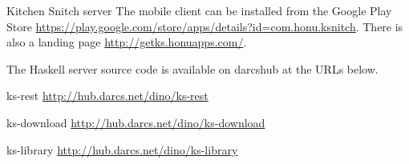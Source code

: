 \documentclass[DIV16,twocolumn,10pt]{scrreprt}
\begin{document}
\begin{hcarentry}{Kitchen Snitch server}
The mobile client can be installed from the Google Play Store \url{https://play.google.com/store/apps/details?id=com.honu.ksnitch}. There is also a landing page \url{http://getks.honuapps.com/}.

\vspace{5mm}

The Haskell server source code is available on darcshub at the URLs below.

\begin{kssrc}
 \item ks-rest \url{http://hub.darcs.net/dino/ks-rest}
 \item ks-download \url{http://hub.darcs.net/dino/ks-download}
 \item ks-library \url{http://hub.darcs.net/dino/ks-library}
\end{kssrc}

\end{hcarentry}
\end{document}
